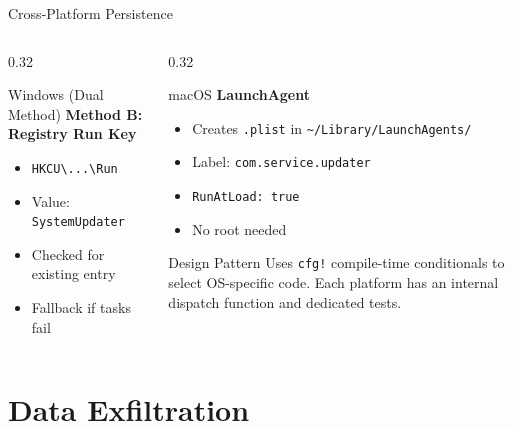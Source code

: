\documentclass[aspectratio=169]{beamer}
\newcommand{\code}[1]{\texttt{\textcolor{primaryblue}{#1}}}
\begin{document}
\begin{frame}{Cross-Platform Persistence}
\begin{columns}[T]
\begin{column}{0.32\textwidth}
\begin{block}{Windows (Dual Method)}
        \vspace{0.3em}
        \textbf{Method B: Registry Run Key}
        \begin{itemize}
          \item \code{HKCU\textbackslash...\textbackslash Run}
          \item Value: \code{SystemUpdater}
          \item Checked for existing entry
          \item Fallback if tasks fail
        \end{itemize}
      \end{block}
    \end{column}
    \begin{column}{0.32\textwidth}
      \begin{block}{macOS}
        \footnotesize
        \textbf{LaunchAgent}
        \begin{itemize}
          \item Creates \code{.plist} in \code{\textasciitilde/Library/LaunchAgents/}
          \item Label: \code{com.service.updater}
          \item \code{RunAtLoad: true}
          \item No root needed
        \end{itemize}
      \end{block}

      \vspace{0.3em}
      \begin{infobox}{Design Pattern}
        Uses \code{cfg!} compile-time conditionals to select OS-specific code. Each platform has an internal dispatch function and dedicated tests.
      \end{infobox}
    \end{column}
  \end{columns}
\end{frame}

\section{Data Exfiltration}
\end{document}
